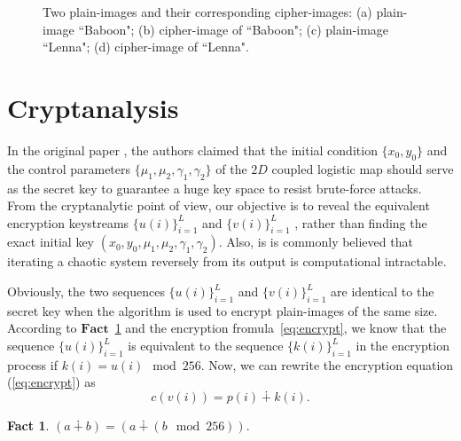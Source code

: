 \documentclass[smallextended, final]{svjour3}          \smartqed
\newlength\imagewidth
\newtheorem{Fact}{Fact}
\begin{document}
\begin{figure}[!htb]
\centering
{}
\caption{Two plain-images and their corresponding cipher-images:
(a) plain-image ``Baboon";
(b) cipher-image of ``Baboon";
(c) plain-image ``Lenna";
(d) cipher-image of ``Lenna".}
\label{fig:encryption}
\end{figure}


\section{Cryptanalysis}
\label{sec:cryptanalysis}
In the original paper \cite{li2012image}, the authors claimed that
the initial condition $\{x_0, y_0\}$ and the control parameters
$\{\mu_1, \mu_2, \gamma_1, \gamma_2\}$ of the $2D$ coupled logistic
map should serve as the secret key to guarantee a huge key space
to resist brute-force attacks. From the cryptanalytic point of view, our objective
is to reveal the equivalent encryption keystreams $\{u(i)\}_{i=1}^{L}$ and $\{v(i)\}_{i=1}^{L}$ \cite[Sec.~3]{zhang2014cryptanalysis},
rather than finding the exact initial key $(x_0, y_0,\mu_1, \mu_2, \gamma_1, \gamma_2)$.
Also, is is commonly believed that iterating a chaotic system reversely from its output is computational intractable.


Obviously, the two sequences $\{u(i)\}_{i=1}^{L}$ and $\{v(i)\}_{i=1}^{L}$ are
identical to the secret key when the algorithm is used to
encrypt plain-images of the same size. According to $\mathbf{Fact}$~\ref{fact} and
the encryption fromula~\eqref{eq:encrypt}, we know that the sequence
$\{u(i)\}_{i=1}^{L}$ is equivalent to the sequence $\{k(i)\}_{i=1}^{L}$
in the encryption process if $k(i) = u(i)\mod{256}$.
Now, we can rewrite the encryption equation (\ref{eq:encrypt}) as
\begin{equation}
\label{eq:ReEncrypt}
c(v(i)) = p(i)\dotplus k(i).
\end{equation}
\begin{Fact}
\label{fact}
$(a\dotplus b) = (a \dotplus (b\mod{256})).$
\end{Fact}
\end{document}
